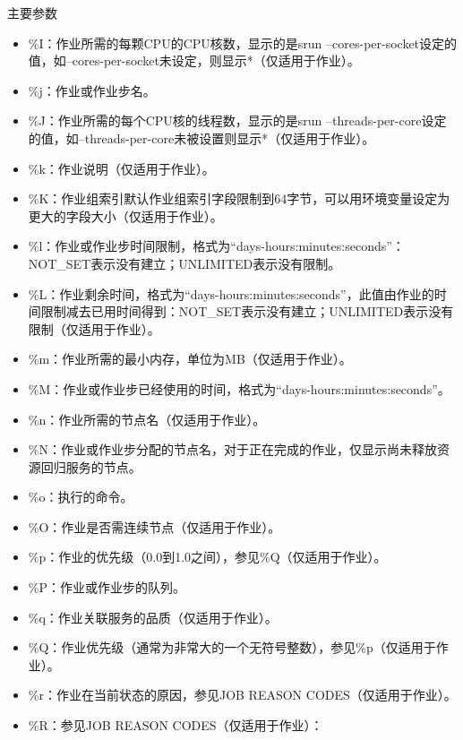 \begin{frame}[fragile]{主要参数}
\begin{itemize}
\begin{itemize}
\begin{itemize}
    \item \%I：作业所需的每颗CPU的CPU核数，显示的是srun --cores-per-socket设定的值，如--cores-per-socket未设定，则显示*（仅适用于作业）。
    \item \%j：作业或作业步名。
	\item \%J：作业所需的每个CPU核的线程数，显示的是srun --threads-per-core设定的值，如--threads-per-core未被设置则显示*（仅适用于作业）。
    \item \%k：作业说明（仅适用于作业）。
    \item \%K：作业组索引默认作业组索引字段限制到64字节，可以用环境变量设定为更大的字段大小（仅适用于作业）。
    \item \%l：作业或作业步时间限制，格式为``days-hours:minutes:seconds''：NOT\_SET表示没有建立；UNLIMITED表示没有限制。
    \item \%L：作业剩余时间，格式为``days-hours:minutes:seconds''，此值由作业的时间限制减去已用时间得到：NOT\_SET表示没有建立；UNLIMITED表示没有限制（仅适用于作业）。
    \item \%m：作业所需的最小内存，单位为MB（仅适用于作业）。
    \item \%M：作业或作业步已经使用的时间，格式为``days-hours:minutes:seconds''。
    \item \%n：作业所需的节点名（仅适用于作业）。
    \item \%N：作业或作业步分配的节点名，对于正在完成的作业，仅显示尚未释放资源回归服务的节点。
    \item \%o：执行的命令。
    \item \%O：作业是否需连续节点（仅适用于作业）。
    \item \%p：作业的优先级（0.0到1.0之间），参见\%Q（仅适用于作业）。
    \item \%P：作业或作业步的队列。
    \item \%q：作业关联服务的品质（仅适用于作业）。
    \item \%Q：作业优先级（通常为非常大的一个无符号整数），参见\%p（仅适用于作业）。
    \item \%r：作业在当前状态的原因，参见JOB REASON CODES（仅适用于作业）。
    \item \%R：参见JOB REASON CODES（仅适用于作业）：

\end{itemize}
\end{itemize}
\end{itemize}
\end{frame}
